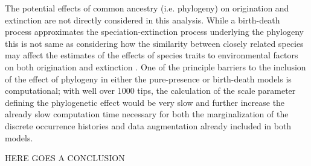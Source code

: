 \documentclass[12pt,letterpaper]{article}
\begin{document}
The potential effects of common ancestry (i.e. phylogeny) on origination and extinction are not directly considered in this analysis. While a birth-death process approximates the speciation-extinction process underlying the phylogeny \citep{Silvestro2014a} this is not same as considering how the similarity between closely related species may affect the estimates of the effects of species traits to environmental factors on both origination and extinction \citep{Smits2015b,Harnik2014}. One of the principle barriers to the inclusion of the effect of phylogeny in either the pure-presence or birth-death models is computational; with well over 1000 tips, the calculation of the scale parameter defining the phylogenetic effect would be very slow and further increase the already slow computation time necessary for both the marginalization of the discrete occurrence histories and data augmentation already included in both models.

\uppercase{here goes a conclusion}
\end{document}
